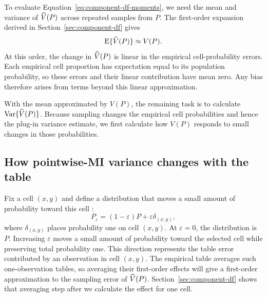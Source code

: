To evaluate Equation~\eqref{eq:component-df-moments}, we need the mean and
variance of \(\widehat V(P)\) across repeated samples from \(P\). The first-order
expansion derived in Section~\ref{sec:component-df} gives
\begin{equation*}
  \operatorname{E}\{\widehat V(P)\}\approx V(P).
\end{equation*}
At this order, the change in \(\widehat V(P)\) is linear in the empirical
cell-probability errors. Each empirical cell proportion has expectation
equal to its population probability, so these errors and their linear
contribution have mean zero. Any bias therefore arises from terms beyond
this linear approximation.

With the mean approximated by \(V(P)\), the remaining task is to
calculate \(\operatorname{Var}\{\widehat V(P)\}\). Because sampling changes the empirical
cell probabilities and hence the plug-in variance estimate, we first
calculate how \(V(P)\) responds to small changes in those probabilities.

\begin{samepage}
\section{How pointwise-MI variance changes with the table}

Fix a cell \((x,y)\) and define a distribution that moves a small amount
of probability toward this cell \citep{hampel1974,vanderVaart1998}:
\begin{equation}
  P_\varepsilon
  =(1-\varepsilon)P+\varepsilon\delta_{(x,y)},
  \label{eq:contamination-path}
\end{equation}
where \(\delta_{(x,y)}\) places probability one on cell \((x,y)\). At
\(\varepsilon=0\), the distribution is \(P\). Increasing \(\varepsilon\)
moves a small amount of probability toward the selected cell while preserving
total probability one. This direction represents the table error contributed
by an observation in cell \((x,y)\). The empirical table averages such
one-observation tables, so averaging their first-order effects will give
a first-order approximation to the sampling error of \(\widehat V(P)\).
Section~\ref{sec:component-df} shows that averaging step after we calculate
the effect for one cell.
\par
\end{samepage}

